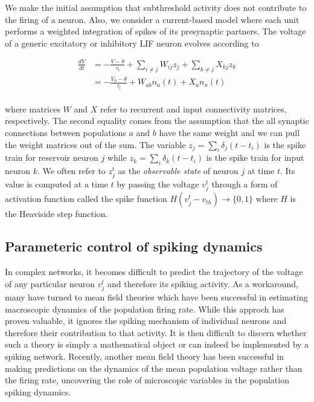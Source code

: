 \documentclass{article} %
\begin{document}
We make the initial assumption that subthreshold activity does not contribute to the firing of a neuron. Also, we consider a current-based model where each unit performs a weighted integration of spikes of its presynaptic partners. The voltage of a generic excitatory or inhibitory LIF neuron evolves according to

\begin{align*}
\frac{dV}{dt} &= -\frac{V-\theta}{\tau_{l}} + \sum_{i \neq j}W_{ij}z_{j} + \sum_{k \neq j} X_{kj}z_{k}\\
&= -\frac{V_{0}-\theta}{\tau_{l}} + W_{ab}n_{a}(t) + X_{a}n_{x}(t)\\
\end{align*}

where matrices $W$ and $X$ refer to recurrent and input connectivity matrices, respectively. The second equality comes from the assumption that the all synaptic connections between populations $a$ and $b$ have the same weight and we can pull the weight matrices out of the sum. The variable $z_{j} = \sum_{i} \delta_{j} (t-t_{i})$ is the spike train for reservoir neuron $j$ while $z_{k} = \sum_{i} \delta_{k} (t-t_{i})$ is the spike train for input neuron $k$. We often refer to $z_{j}^{t}$ as the \emph{observable state} of neuron $j$ at time $t$. Its value is computed at a time $t$ by passing the voltage $v_{j}^{t}$ through a form of activation function called the spike function $H(v_{j}^{t} - v_{th}) \rightarrow \{0,1\}$ where $H$ is the Heaviside step function.

\subsection{Parameteric control of spiking dynamics}

In complex networks, it becomes difficult to predict the trajectory of the voltage of any particular neuron $v_{j}^{t}$ and therefore its spiking activity. As a workaround, many have turned to mean field theories which have been successful in estimating macroscopic dynamics of the population firing rate. While this approch has proven valuable, it ignores the spiking mechanism of individual neurons and therefore their contribution to that activity. It is then difficult to discern whether such a theory is simply a mathematical object or can indeed be implemented by a spiking network. Recently, another mean field theory has been successful in making predictions on the dynamics of the mean population voltage rather than the firing rate, uncovering the role of microscopic variables in the population spiking dynamics. 
\end{document}
